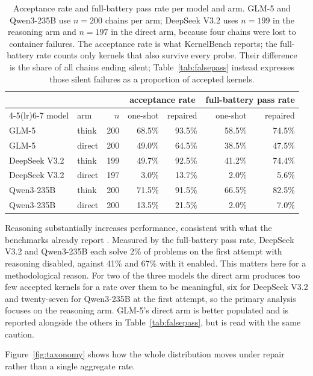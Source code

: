 \documentclass[12pt]{article}
\begin{document}
\begin{table}[h]
\centering
\begin{tabular}{llrrrrr}
\toprule
& & & \multicolumn{2}{c}{acceptance rate} & \multicolumn{2}{c}{full-battery pass rate} \\
\cmidrule(lr){4-5}\cmidrule(lr){6-7}
model & arm & $n$ & one-shot & repaired & one-shot & repaired \\
\midrule
GLM-5         & think  & 200 & 68.5\% & 93.5\% & 58.5\% & 74.5\% \\
GLM-5         & direct & 200 & 49.0\% & 64.5\% & 38.5\% & 47.5\% \\
DeepSeek V3.2 & think  & 199 & 49.7\% & 92.5\% & 41.2\% & 74.4\% \\
DeepSeek V3.2 & direct & 197 &  3.0\% & 13.7\% &  2.0\% &  5.6\% \\
Qwen3-235B    & think  & 200 & 71.5\% & 91.5\% & 66.5\% & 82.5\% \\
Qwen3-235B    & direct & 200 & 13.5\% & 21.5\% &  2.0\% &  7.0\% \\
\bottomrule
\end{tabular}
\caption{Acceptance rate and full-battery pass rate per model and arm. GLM-5
and Qwen3-235B use $n = 200$ chains per arm; DeepSeek V3.2 uses $n = 199$ in
the reasoning arm and $n = 197$ in the direct arm, because four chains were
lost to container failures. The acceptance rate is what KernelBench reports;
the full-battery rate counts only kernels that also survive every probe. Their
difference is the share of all chains ending silent; Table~\ref{tab:falsepass}
instead expresses those silent failures as a proportion of accepted kernels.}
\label{tab:passrates}
\end{table}

Reasoning substantially increases performance, consistent with what the
benchmarks already report \citep{ouyang2025kernelbench, zhu2026cudabench}.
Measured by the full-battery pass rate, DeepSeek V3.2 and Qwen3-235B each solve
2\% of problems on the first attempt with reasoning disabled, against 41\% and
67\% with it enabled. This matters here for a methodological reason. For two of the three models the
direct arm produces too few accepted kernels for a rate over them to be
meaningful, six for DeepSeek V3.2 and twenty-seven for Qwen3-235B at the first
attempt, so the primary analysis focuses on the reasoning arm. GLM-5's direct
arm is better populated and is reported alongside the others in
Table~\ref{tab:falsepass}, but is read with the same caution.

Figure~\ref{fig:taxonomy} shows how the whole distribution moves under repair
rather than a single aggregate rate.
\end{document}
